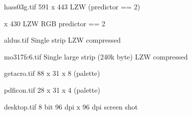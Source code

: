 
\def\newpage{\vfill\eject}


\hbox{} \vskip 5in


\noindent hass03g.tif 591 x 443 LZW (predictor == 2)

\newpage

\hbox{} \vskip 7in


 x 430 LZW RGB predictor == 2

\newpage

\hbox{} \vskip 5.5in


\noindent aldus.tif Single strip LZW compressed

\newpage

\hbox{} \vskip 7in


\noindent mo317fc6.tif Single large strip (240k byte) LZW compressed

\newpage

\hbox{} \vskip 1in


\noindent getacro.tif 88 x 31 x 8 (palette)

\vskip 2in



\noindent pdficon.tif 28 x 31 x 4 (palette)

\newpage

\hbox{} \vskip 2in


\noindent desktop.tif 8 bit 96 dpi x 96 dpi screen shot

\newpage

\hbox{} \vskip 6in


